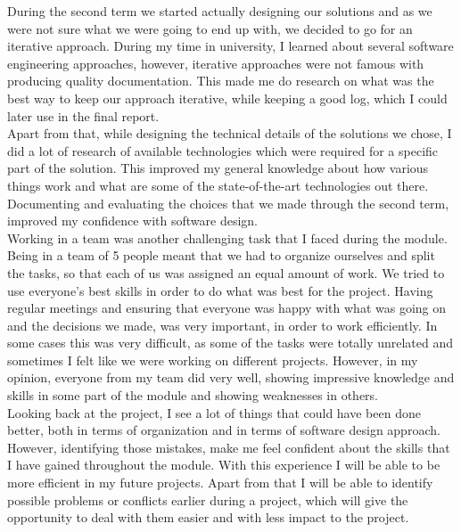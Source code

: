 \documentclass[]{article}
\begin{document}
During the second term we started actually designing our solutions and as we were not sure what we were going to end up with, we decided to go for an iterative approach. During my time in university, I learned about several software engineering approaches, however, iterative approaches were not famous with producing quality documentation. This made me do research on what was the best way to keep our approach iterative, while keeping a good log, which I could later use in the final report.\\

Apart from that, while designing the technical details of the solutions we chose, I did a lot of research of available technologies which were required for a specific part of the solution. This improved my general knowledge about how various things work and what are some of the state-of-the-art technologies out there. Documenting and evaluating the choices that we made through the second term, improved my confidence with software design.\\

Working in a team was another challenging task that I faced during the module. Being in a team of 5 people meant that we had to organize ourselves and split the tasks, so that each of us was assigned an equal amount of work. We tried to use everyone’s best skills in order to do what was best for the project. Having regular meetings and ensuring that everyone was happy with what was going on and the decisions we made, was very important, in order to work efficiently. In some cases this was very difficult, as some of the tasks were totally unrelated and sometimes I felt like we were working on different projects. However, in my opinion, everyone from my team did very well, showing impressive knowledge and skills in some part of the module and showing weaknesses in others.\\

Looking back at the project, I see a lot of things that could have been done better, both in terms of organization and in terms of software design approach. However, identifying those mistakes, make me feel confident about the skills that I have gained throughout the module. With this experience I will be able to be more efficient in my future projects. Apart from that I will be able to identify possible problems or conflicts earlier during a project, which will give the opportunity to deal with them easier and with less impact to the project.
    \pagebreak
\end{document}
